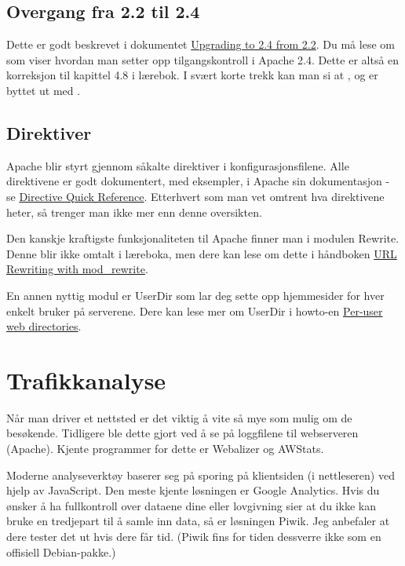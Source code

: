 \subsection{Overgang fra 2.2 til 2.4}

Dette er godt beskrevet i dokumentet
\href{http://httpd.apache.org/docs/2.4/upgrading.html}{Upgrading to 2.4 from 2.2}.
Du må lese om  som viser hvordan man setter opp
tilgangskontroll i Apache 2.4. Dette er altså en korreksjon til kapittel 4.8 
i lærebok. I svært korte trekk kan man si at ,  og 
er byttet ut med .

\subsection{Direktiver}

Apache blir styrt gjennom såkalte direktiver i konfigurasjonsfilene. Alle direktivene 
er godt dokumentert, med eksempler, i Apache sin dokumentasjon - se
\href{http://httpd.apache.org/docs/2.4/mod/quickreference.html}{Directive Quick Reference}.
Etterhvert som man vet omtrent hva direktivene heter, så trenger man ikke mer
enn denne oversikten. 

Den kanskje kraftigste funksjonaliteten til Apache finner man i modulen Rewrite.
Denne blir ikke omtalt i læreboka, men dere kan lese om dette i håndboken
\href{http://httpd.apache.org/docs/2.4/rewrite/}{URL Rewriting with mod\_rewrite}.

En annen nyttig modul er UserDir som lar deg sette opp hjemmesider for hver enkelt
bruker på serverene. Dere kan lese mer om UserDir i howto-en
\href{http://httpd.apache.org/docs/2.4/howto/public\_html.html}{Per-user web directories}.

\section{Trafikkanalyse}

Når man driver et nettsted er det viktig å vite så mye som mulig om de besøkende.
Tidligere ble dette gjort ved å se på loggfilene til webserveren (Apache). Kjente 
programmer for dette er Webalizer og AWStats.

Moderne analyseverktøy baserer seg på sporing på klientsiden (i nettleseren) ved
hjelp av JavaScript. Den meste kjente løsningen er Google Analytics. Hvis du 
ønsker å ha fullkontroll over dataene dine eller lovgivning sier at du ikke kan bruke 
en tredjepart til å samle inn data, så er løsningen Piwik.
Jeg anbefaler at dere tester det ut hvis dere får tid. 
(Piwik fins for tiden dessverre ikke som en offisiell Debian-pakke.)

